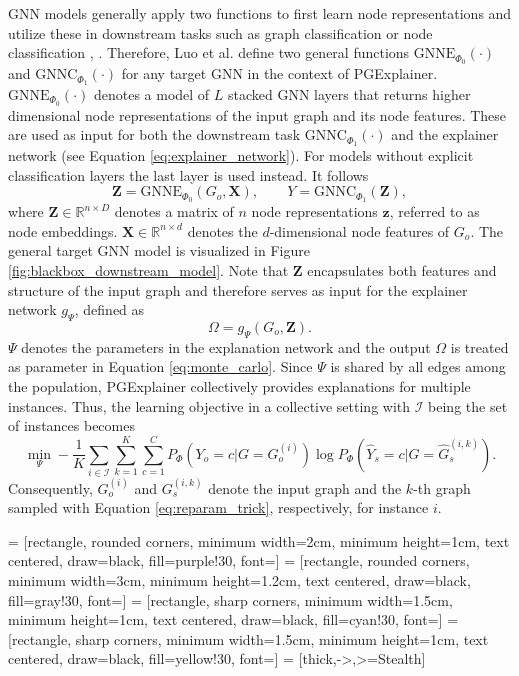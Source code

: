 GNN models generally apply two functions to first learn node representations and utilize these in downstream tasks such as graph classification or node classification \cite{kipf2016semi}, \cite{velivckovic2017graph}. Therefore, Luo et al. \cite{luo2020parameterized} define two general functions $\text{GNNE}_{\Phi_0}(\cdot)$ and $\text{GNNC}_{\Phi_1}(\cdot)$ for any target GNN in the context of PGExplainer. $\text{GNNE}_{\Phi_0}(\cdot)$ denotes a model of $L$ stacked GNN layers that returns higher dimensional node representations of the input graph and its node features. These are used as input for both the downstream task $\text{GNNC}_{\Phi_1}(\cdot)$ and the explainer network (see Equation \ref{eq:explainer_network}). For models without explicit classification layers the last layer is used instead. It follows
\begin{equation}
    \mathbf{Z} = \text{GNNE}_{\Phi_0}(G_o, \mathbf{X}), \qquad Y = \text{GNNC}_{\Phi_1}(\mathbf{Z}),
\end{equation}
where $\mathbf{Z} \in \mathbb{R}^{n\times D}$ denotes a matrix of $n$ node representations $\mathbf{z}$, referred to as node embeddings. $\mathbf{X} \in \mathbb{R}^{n\times d}$ denotes the $d$-dimensional node features of $G_o$. The general target GNN model is visualized in Figure \ref{fig:blackbox_downstream_model}. Note that $\mathbf{Z}$ encapsulates both features and structure of the input graph and therefore serves as input for the explainer network $g_\Psi$, defined as
\begin{equation}
    \label{eq:explainer_network}
    \Omega = g_\Psi(G_o,\mathbf{Z}).
\end{equation}
$\Psi$ denotes the parameters in the explanation network and the output $\Omega$ is treated as parameter in Equation \ref{eq:monte_carlo}. Since $\Psi$ is shared by all edges among the population, PGExplainer collectively provides explanations for multiple instances. Thus, the learning objective in a collective setting with $\mathcal{I}$ being the set of instances becomes
\begin{equation}
    \label{eq:mlp_loss}
    \min_\Psi -\frac{1}{K}\sum_{i\in \mathcal{I}}\sum_{k=1}^K\sum_{c=1}^C P_\Phi (Y_o = c|G = G_o^{(i)}) \log P_\Phi(\hat{Y}_s = c|G=\hat{G}_s^{(i,k)}).
\end{equation}
Consequently, $G_o^{(i)}$ and $G_s^{(i,k)}$ denote the input graph and the $k$-th graph sampled with Equation \ref{eq:reparam_trick}, respectively, for instance $i$. \bigskip 

 = [rectangle, rounded corners, minimum width=2cm, minimum height=1cm, text centered, draw=black, fill=purple!30, font=\small]
 = [rectangle, rounded corners, minimum width=3cm, minimum height=1.2cm, text centered, draw=black, fill=gray!30, font=\small]
 = [rectangle, sharp corners, minimum width=1.5cm, minimum height=1cm, text centered, draw=black, fill=cyan!30, font=\small]
 = [rectangle, sharp corners, minimum width=1.5cm, minimum height=1cm, text centered, draw=black, fill=yellow!30, font=\small]
 = [thick,->,>=Stealth]    %


